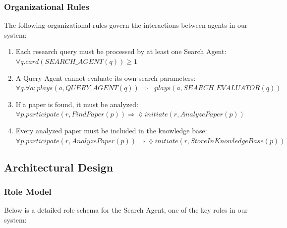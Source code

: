 \documentclass[11pt,a4paper]{article}
\begin{document}
\subsubsection{Organizational Rules}
The following organizational rules govern the interactions between agents in our system:

\begin{enumerate}
    \item Each research query must be processed by at least one Search Agent: \\
    $\forall q.card(SEARCH\_AGENT(q)) \geq 1$
    
    \item A Query Agent cannot evaluate its own search parameters: \\
    $\forall q. \forall a: plays(a, QUERY\_AGENT(q)) \Rightarrow \neg plays(a, SEARCH\_EVALUATOR(q))$
    
    \item If a paper is found, it must be analyzed: \\
    $\forall p. participate(r, FindPaper(p)) \Rightarrow \lozenge initiate(r, AnalyzePaper(p))$
    
    \item Every analyzed paper must be included in the knowledge base: \\
    $\forall p. participate(r, AnalyzePaper(p)) \Rightarrow \lozenge initiate(r, StoreInKnowledgeBase(p))$
\end{enumerate}

\subsection{Architectural Design}

\subsubsection{Role Model}
Below is a detailed role schema for the Search Agent, one of the key roles in our system:
\end{document}
